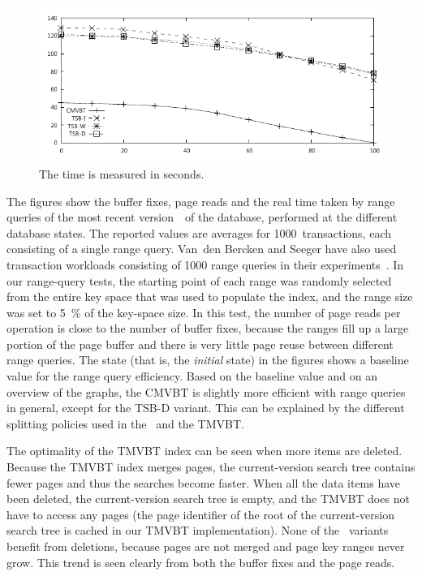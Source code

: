 \begin{figure}[!htb]
\begin{center}
\includegraphics[width=\testimagewidth]{images/tests/uniform/range-time}
%
{The time is measured in seconds.}
\label{fig:range-time}
\end{center}
\end{figure}

The figures show the buffer fixes, page reads and the real time taken by
range queries of the most recent version~\comver\ of the database, performed
at the different database states. 
The reported values are averages for \num{1000}~transactions, each consisting
of a single range query.
Van~den Bercken and Seeger have also used transaction workloads consisting
of \num{1000} range queries in their
experiments~\cite{bercken:1996:multiversion}.
In our range-query tests, the starting point of each range was randomly
selected from the entire key space that was used to populate the index, and
the range size was set to \SI{5}{\percent} of the key-space size. 
In this test, the number of page reads per operation is close to the
number of buffer fixes, because the ranges fill up a large portion of the
page buffer and there is very little page reuse between different
range queries.
The  state (that is, the \emph{initial} state) in the
figures shows a baseline value for the range query efficiency.
Based on the baseline value and on an overview of the graphs, the
CMVBT is slightly more efficient with range queries in general, except for
the TSB-D variant. 
This can be explained by the different splitting policies used in the
\TSBtree\ and the TMVBT\@. 

The optimality of the TMVBT index can be seen when more items are
deleted.
Because the TMVBT index merges pages, the current-version search tree
contains fewer pages and thus the searches become faster.
When all the data items have been deleted, the current-version search
tree is empty, and the TMVBT does not have to access any pages (the
page identifier of the root of the current-version search tree is cached in
our TMVBT implementation). 
None of the \TSBtree\ variants benefit from deletions, because
pages are not merged and page key ranges never grow.
This trend is seen clearly from both the buffer fixes and the
page reads. 

